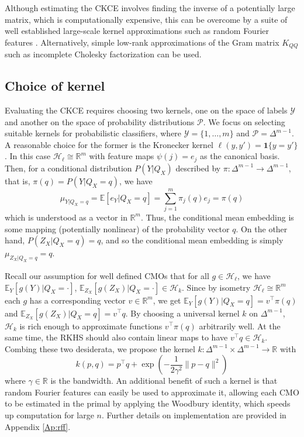 \documentclass[twocolumn]{article}
\theoremstyle{definition}
\begin{document}
Although estimating the CKCE involves finding the inverse of a potentially large matrix, which is computationally expensive, this can be overcome by a suite of well established large-scale kernel approximations such as random Fourier features \citep{rahimiRandomFeaturesLargescale2007}. Alternatively, simple low-rank approximations of the Gram matrix $K_{QQ}$ such as incomplete Cholesky factorization \citep{Fine_2002} can be used. 


\subsection{Choice of kernel} \label{sec:choice_kernel}

Evaluating the CKCE requires choosing two kernels, one on the space of labels $\mathcal{Y}$ and another on the space of probability distributions $\mathcal{P}$. We focus on selecting suitable kernels for probabilistic classifiers, where $\mathcal{Y} = \{ 1, \ldots, m\}$ and $\mathcal{P} = \Delta^{m-1}$. A reasonable choice for the former is the Kronecker kernel $\ell(y,y') = \mathbf{1}\{ y = y' \}$. In this case $\mathcal{H}_\ell \cong \mathbb{R}^m$ with feature maps $\psi(j) = e_j$ as the canonical basis. Then, for a conditional distribution $P(Y|Q_X)$ described by $\pi: \Delta^{m-1} \to \Delta^{m-1}$, that is, $\pi(q) = P(Y | Q_X =q)$, we have 
\begin{equation*}
    \mu_{Y|Q_X=q} = \mathbb{E}[e_Y | Q_X=q] = \sum_{j=1}^m \pi_j(q) e_j = \pi(q)
\end{equation*}
which is understood as a vector in $\mathbb{R}^m$. Thus, the conditional mean embedding is some mapping (potentially nonlinear) of the probability vector $q$. On the other hand, $P(Z_X | Q_X =q) = q$, and so the conditional mean embedding is simply $\mu_{Z_X|Q_X=q} = q$. 

Recall our assumption for well defined CMOs that for all $g \in \mathcal{H}_\ell$, we have $\mathbb{E}_Y[g(Y)|Q_X = \cdot]$, $\mathbb{E}_{Z_X}[g(Z_X)|Q_X = \cdot] \in \mathcal{H}_k$. Since by isometry $\mathcal{H}_\ell \cong \mathbb{R}^m$ each $g$ has a corresponding vector $v \in \mathbb{R}^m$, we get $\mathbb{E}_Y[g(Y)|Q_X = q] = v^\top \pi(q)$ and $\mathbb{E}_{Z_X}[g(Z_X)|Q_X = q] = v^\top q$. By choosing a universal kernel $k$ on $\Delta^{m-1}$, $\mathcal{H}_k$ is rich enough to approximate functions $v^\top \pi(q)$ arbitrarily well. At the same time, the RKHS should also contain linear maps to have $v^\top q \in \mathcal{H}_k$. Combing these two desiderata, we propose the kernel $k: \Delta^{m-1} \times \Delta^{m-1} \to \mathbb{R}$ with
\begin{equation*}
    k(p,q) = p^\top q + \exp\left( -\frac{1}{2 \gamma^2} \| p - q \|^2 \right)
\end{equation*}
where $\gamma \in \mathbb{R}$ is the bandwidth. An additional benefit of such a kernel is that random Fourier features can easily be used to approximate it, allowing each CMO to be estimated in the primal by applying the Woodbury identity, which speeds up computation for large $n$. Further details on implementation are provided in Appendix \ref{Ap:rff}.
\end{document}
